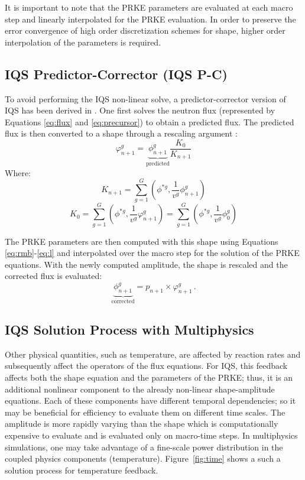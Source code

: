 \documentclass{anstrans}
\newcommand{\be}{\begin{equation}}
\newcommand{\ee}{\end{equation}}
\begin{document}
It is important to note that the PRKE parameters are evaluated at each macro step and linearly interpolated for the PRKE evaluation. In order to preserve the error convergence of high order discretization schemes for shape, higher order interpolation of the parameters is required.

\subsection{IQS Predictor-Corrector (IQS P-C)}

To avoid performing the IQS non-linear solve, a predictor-corrector version of IQS has been derived in \cite{Dulla2008}. One first solves the neutron flux (represented by Equations \ref{eq:flux} and \ref{eq:precursor}) to obtain a predicted flux. The predicted flux is then converted to a shape through a rescaling argument :
\be
\varphi^g_{n+1} = \underbrace{\phi^g_{n+1}}_{\text{predicted}} \frac{K_0}{K_{n+1}}
\label{eq:rescale}
\ee
Where:
\be
K_{n+1} =\sum_{g=1}^G\left(\phi^{*g},\frac{1}{v^g}\phi^g_{n+1}\right)
\ee
\be
K_{0} =\sum_{g=1}^G\left(\phi^{*g},\frac{1}{v^g}\varphi^g_{n+1}\right)=\sum_{g=1}^G\left(\phi^{*g},\frac{1}{v^g}\phi^g_{0}\right)
\ee

The PRKE parameters are then computed with this shape using Equations \eqref{eq:rmb}-\eqref{eq:l} and interpolated over the macro step for the solution of the PRKE equations.  With the newly computed amplitude, the shape is rescaled and the corrected flux is evaluated:
\be
\underbrace{\phi^g_{n+1}}_{\text{corrected}} = p_{n+1} \times \varphi^g_{n+1} \,.
\ee

\subsection{IQS Solution Process with Multiphysics}

Other physical quantities, such as temperature, are affected by reaction rates and subsequently affect the operators of the flux equations.  
For IQS, this feedback affects both the shape equation and the parameters of the PRKE; thus, it is an additional nonlinear component to the 
already non-linear shape-amplitude equations.  Each of these components have different temporal dependencies; so it may be beneficial for 
efficiency to evaluate them on different time scales.  The amplitude is more rapidly varying than the shape which is computationally expensive to evaluate
and is evaluated only on macro-time steps. In multiphysics simulations, one may take advantage of a fine-scale power distribution in the coupled
physics components (temperature). Figure~\ref{fig:time} shows a such a solution process for temperature feedback.
\end{document}
